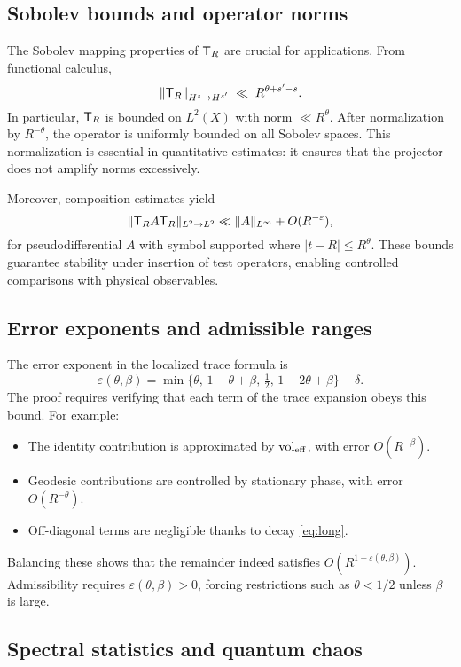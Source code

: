 \subsection{Sobolev bounds and operator norms}\label{subsec:microlocal-sobolev}

The Sobolev mapping properties of $\mathsf{T}_R$ are crucial for applications. From functional calculus,
\[
\|\mathsf{T}_R\|_{H^s\to H^{s'}} \;\ll\; R^{\theta+s'-s}.
\]
In particular, $\mathsf{T}_R$ is bounded on $L^2(X)$ with norm $\ll R^\theta$. After normalization by $R^{-\theta}$, the operator is uniformly bounded on all Sobolev spaces. This normalization is essential in quantitative estimates: it ensures that the projector does not amplify norms excessively.

Moreover, composition estimates yield
\[
\|\mathsf{T}_R A \mathsf{T}_R\|_{L^2\to L^2} \ll \|A\|_{L^\infty}+ O(R^{-\varepsilon}),
\]
for pseudodifferential $A$ with symbol supported where $|t-R|\le R^\theta$. These bounds guarantee stability under insertion of test operators, enabling controlled comparisons with physical observables.

\subsection{Error exponents and admissible ranges}\label{subsec:microlocal-errors}

The error exponent in the localized trace formula is
\[
\varepsilon(\theta,\beta) = \min\{\theta,\,1-\theta+\beta,\,\tfrac12,\,1-2\theta+\beta\}-\delta.
\]
The proof requires verifying that each term of the trace expansion obeys this bound. For example:
\begin{itemize}
\item The identity contribution is approximated by $\operatorname{vol}_{\mathrm{eff}}$, with error $O(R^{-\beta})$.
\item Geodesic contributions are controlled by stationary phase, with error $O(R^{-\theta})$.
\item Off-diagonal terms are negligible thanks to decay \eqref{eq:long}.
\end{itemize}
Balancing these shows that the remainder indeed satisfies $O(R^{1-\varepsilon(\theta,\beta)})$. Admissibility requires $\varepsilon(\theta,\beta)>0$, forcing restrictions such as $\theta<1/2$ unless $\beta$ is large.

\subsection{Spectral statistics and quantum chaos}\label{subsec:microlocal-chaos}

